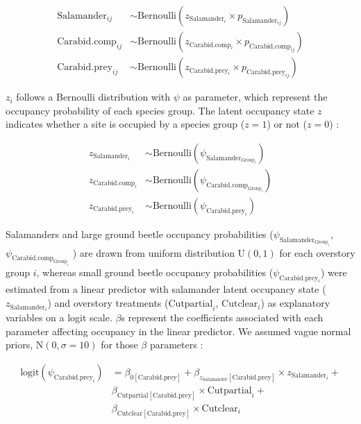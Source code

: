 \begin{align}
  \text{Salamander}_{ij} &\sim \text{Bernoulli}(z_{\text{Salamander}_i} \times p_{\text{Salamander}_{ij}}) \nonumber \\
  \text{Carabid.comp}_{ij} &\sim \text{Bernoulli}(z_{\text{Carabid.comp}_i} \times p_{\text{Carabid.comp}_{ij}})  \\
  \text{Carabid.prey}_{ij} &\sim \text{Bernoulli}(z_{\text{Carabid.prey}_i} \times p_{\text{Carabid.prey}_{ij}}) \nonumber
\end{align}


$z_{i}$ follows a Bernoulli distribution with $\psi$ as parameter, 
which represent the occupancy probability of each species group. 
The latent occupancy state $z$ indicates whether a site is occupied by a species group ($z = 1$) or not ($z = 0$) :


\begin{align}
  z_{\text{Salamander}_i} &\sim \text{Bernoulli}(\psi_{\text{Salamander}_{\text{Group}_i}}) \nonumber \\
  z_{\text{Carabid.comp}_i} &\sim \text{Bernoulli}(\psi_{\text{Carabid.comp}_{\text{Group}_i}}) \\
  z_{\text{Carabid.prey}_i} &\sim \text{Bernoulli}(\psi_{\text{Carabid.prey}_{i}}) \nonumber
\end{align}


Salamanders and large ground beetle occupancy probabilities ($\psi_{\text{Salamander}_{\text{Group}_i}}$, $\psi_{\text{Carabid.comp}_{\text{Group}_i}}$ ) are drawn from uniform distribution $\text{U}(0, 1)$ for each overstory group $i$, 
whereas small ground beetle occupancy probabilities ($\psi_{\text{Carabid.prey}_{i}}$) were estimated from a linear predictor with salamander latent occupancy state ($z_{\text{Salamander}_i}$) and overstory treatments 
($\text{Cutpartial}_i$, $\text{Cutclear}_i$) as explanatory variables on a logit scale. 
$\beta$s represent the coefficients associated with each parameter affecting occupancy in the linear predictor. 
We assumed vague normal priors, $\text{N}(0, \sigma = 10)$ for those $\beta$ parameters :


\begin{align}
  \text{logit}(\psi_{\text{Carabid.prey}_i}) &= \beta_{0[\text{Carabid.prey}]} + \beta_{z_{\text{Salamander}}[\text{Carabid.prey}]} \times z_{\text{Salamander}_i} + \nonumber \\
  &\beta_{\text{Cutpartial}[\text{Carabid.prey}]} \times \text{Cutpartial}_i + \\
  &\beta_{\text{Cutclear}[\text{Carabid.prey}]} \times \text{Cutclear}_i \nonumber
\end{align}

